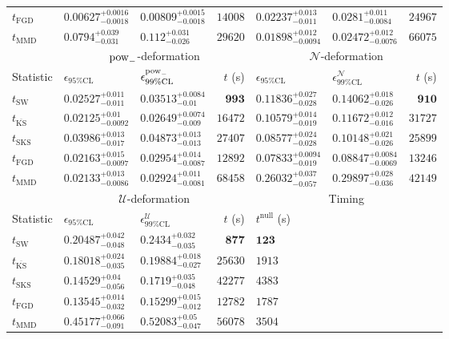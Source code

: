 \begin{tabular}{l|llr|llr}
	$t_{\mathrm{FGD}}$ & ${\mathbf{0.00627_{-0.0018}^{+0.0016}}}$ & ${\mathbf{0.00809_{-0.0018}^{+0.0015}}}$ & $14008$ & $0.02237_{-0.011}^{+0.013}$ & $0.0281_{-0.0084}^{+0.011}$ & $24967$ \\
	$t_{\mathrm{MMD}}$ & $0.0794_{-0.031}^{+0.039}$ & $0.112_{-0.026}^{+0.031}$ & $29620$ & ${\mathbf{0.01898_{-0.0094}^{+0.012}}}$ & ${\mathbf{0.02472_{-0.0076}^{+0.012}}}$ & $66075$ \\
	\toprule
	\multicolumn{1}{c}{} & \multicolumn{3}{c}{$\rm{pow}_{-}$-deformation} & \multicolumn{3}{c}{$\mathcal{N}$-deformation} \\
	Statistic & $\epsilon_{95\%\mathrm{CL}}$ & $\epsilon^  {\rm{pow}_{-}}_{99\%\mathrm{CL}}$ & $t$ (s) & $\epsilon_{95\%\mathrm{CL}}$ & $\epsilon^    {\mathcal{N}}_{99\%\mathrm{CL}}$ & $t$ (s) \\
	\midrule
	$t_{\mathrm{SW}}$ & $0.02527_{-0.011}^{+0.011}$ & $0.03513_{-0.01}^{+0.0084}$ & ${\mathbf{993}}$ & $0.11836_{-0.028}^{+0.027}$ & $0.14062_{-0.026}^{+0.018}$ & ${\mathbf{910}}$ \\
	$t_{\overline{\mathrm{KS}}}$ & ${\mathbf{0.02125_{-0.0092}^{+0.01}}}$ & ${\mathbf{0.02649_{-0.009}^{+0.0074}}}$ & $16472$ & $0.10579_{-0.019}^{+0.014}$ & $0.11672_{-0.016}^{+0.012}$ & $31727$ \\
	$t_{\mathrm{SKS}}$ & $0.03986_{-0.017}^{+0.013}$ & $0.04873_{-0.013}^{+0.013}$ & $27407$ & $0.08577_{-0.028}^{+0.024}$ & $0.10148_{-0.026}^{+0.021}$ & $25899$ \\
	$t_{\mathrm{FGD}}$ & $0.02163_{-0.0097}^{+0.015}$ & $0.02954_{-0.0087}^{+0.014}$ & $12892$ & ${\mathbf{0.07833_{-0.019}^{+0.0094}}}$ & ${\mathbf{0.08847_{-0.0069}^{+0.0084}}}$ & $13246$ \\
	$t_{\mathrm{MMD}}$ & $0.02133_{-0.0086}^{+0.013}$ & $0.02924_{-0.0081}^{+0.011}$ & $68458$ & $0.26032_{-0.057}^{+0.037}$ & $0.29897_{-0.036}^{+0.028}$ & $42149$ \\
	\toprule
	\multicolumn{1}{c}{} & \multicolumn{3}{c}{$\mathcal{U}$-deformation} & \multicolumn{3}{c}{Timing} \\
	Statistic & $\epsilon_{95\%\mathrm{CL}}$ & $\epsilon^    {\mathcal{U}}_{99\%\mathrm{CL}}$ & $t$ (s) & $t^{\mathrm{null}}$ (s) \\
	\midrule
	$t_{\mathrm{SW}}$ & $0.20487_{-0.048}^{+0.042}$ & $0.2434_{-0.035}^{+0.032}$ & ${\mathbf{877}}$ & ${\mathbf{123}}$ \\
	$t_{\overline{\mathrm{KS}}}$ & $0.18018_{-0.035}^{+0.024}$ & $0.19884_{-0.027}^{+0.018}$ & $25630$ & $1913$ \\
	$t_{\mathrm{SKS}}$ & $0.14529_{-0.056}^{+0.04}$ & $0.1719_{-0.048}^{+0.035}$ & $42277$ & $4383$ \\
	$t_{\mathrm{FGD}}$ & ${\mathbf{0.13545_{-0.032}^{+0.014}}}$ & ${\mathbf{0.15299_{-0.012}^{+0.015}}}$ & $12782$ & $1787$ \\
	$t_{\mathrm{MMD}}$ & $0.45177_{-0.091}^{+0.066}$ & $0.52083_{-0.047}^{+0.05}$ & $56078$ & $3504$ \\
	\bottomrule
\end{tabular}